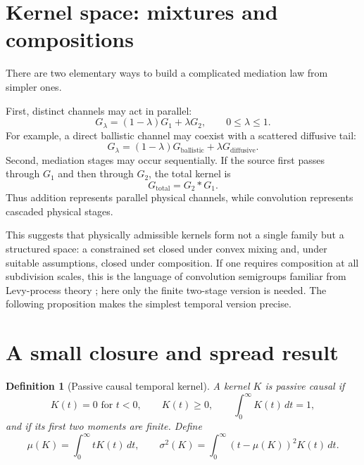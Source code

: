 \documentclass[10pt]{article}
\newtheorem{definition}{Definition}
\begin{document}
\section{Kernel space: mixtures and compositions}

There are two elementary ways to build a complicated mediation law from simpler ones.

First, distinct channels may act in parallel:
\begin{equation}\label{eq:mixture}
G_\lambda=(1-\lambda)G_1+\lambda G_2,
\qquad 0\le \lambda\le 1.
\end{equation}
For example, a direct ballistic channel may coexist with a scattered diffusive tail:
\[
G_\lambda=(1-\lambda)G_{\mathrm{ballistic}}+
\lambda G_{\mathrm{diffusive}}.
\]
Second, mediation stages may occur sequentially. If the source first passes through $G_1$ and then through $G_2$, the total kernel is
\begin{equation}\label{eq:composition}
G_{\mathrm{total}}=G_2*G_1.
\end{equation}
Thus addition represents parallel physical channels, while convolution represents cascaded physical stages.

This suggests that physically admissible kernels form not a single family but a structured space: a constrained set closed under convex mixing and, under suitable assumptions, closed under composition. If one requires composition at all subdivision scales, this is the language of convolution semigroups familiar from Levy-process theory \cite{applebaum2009}; here only the finite two-stage version is needed. The following proposition makes the simplest temporal version precise.

\section{A small closure and spread result}

\begin{definition}[Passive causal temporal kernel]
A kernel $K$ is passive causal if
\[
K(t)=0\text{ for }t<0,\qquad K(t)\ge 0,
\qquad \int_0^\infty K(t)\,dt=1,
\]
and if its first two moments are finite. Define
\[
\mu(K)=\int_0^\infty tK(t)\,dt,
\qquad
\sigma^2(K)=\int_0^\infty (t-\mu(K))^2K(t)\,dt.
\]
\end{definition}
\end{document}
